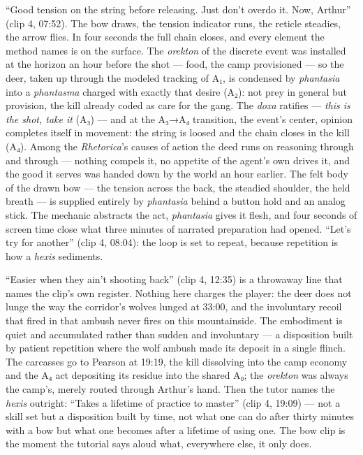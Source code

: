 ``Good tension on the string before releasing. Just don't overdo it. Now, Arthur'' (clip 4, 07:52). The bow draws, the tension indicator runs, the reticle steadies, the arrow flies. In four seconds the full chain closes, and every element the method names is on the surface. The \textit{orekton} of the discrete event was installed at the horizon an hour before the shot — food, the camp provisioned — so the deer, taken up through the modeled tracking of A₁, is condensed by \textit{phantasia} into a \textit{phantasma} charged with exactly that desire (A₂): not prey in general but provision, the kill already coded as care for the gang. The \textit{doxa} ratifies — \textit{this is the shot, take it} (A₃) — and at the A₃→A₄ transition, the event's center, opinion completes itself in movement: the string is loosed and the chain closes in the kill (A₄). Among the \textit{Rhetorica}'s causes of action the deed runs on reasoning through and through — nothing compels it, no appetite of the agent's own drives it, and the good it serves was handed down by the world an hour earlier. The felt body of the drawn bow — the tension across the back, the steadied shoulder, the held breath — is supplied entirely by \textit{phantasia} behind a button hold and an analog stick. The mechanic abstracts the act, \textit{phantasia} gives it flesh, and four seconds of screen time close what three minutes of narrated preparation had opened. ``Let's try for another'' (clip 4, 08:04): the loop is set to repeat, because repetition is how a \textit{hexis} sediments.

``Easier when they ain't shooting back'' (clip 4, 12:35) is a throwaway line that names the clip's own register. Nothing here charges the player: the deer does not lunge the way the corridor's wolves lunged at 33:00, and the involuntary recoil that fired in that ambush never fires on this mountainside. The embodiment is quiet and accumulated rather than sudden and involuntary — a disposition built by patient repetition where the wolf ambush made its deposit in a single flinch. The carcasses go to Pearson at 19:19, the kill dissolving into the camp economy and the A₄ act depositing its residue into the shared A₀; the \textit{orekton} was always the camp's, merely routed through Arthur's hand. Then the tutor names the \textit{hexis} outright: ``Takes a lifetime of practice to master'' (clip 4, 19:09) — not a skill set but a disposition built by time, not what one can do after thirty minutes with a bow but what one becomes after a lifetime of using one. The bow clip is the moment the tutorial says aloud what, everywhere else, it only does.

